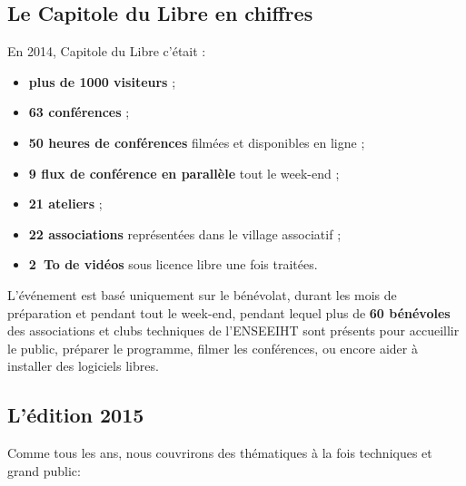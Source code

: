 \subsection{Le Capitole du Libre en chiffres}

\begin{minipage}{0.6\textwidth}
En 2014, Capitole du Libre c'était :
\begin{itemize}[label=$\bullet$]
\item \textbf{plus de 1000 visiteurs} ;
\item \textbf{63 conférences} ;
\item \textbf{50 heures de conférences} filmées et disponibles en ligne ;
\item \textbf{9 flux de conférence en parallèle} tout le week-end ;
\item \textbf{21 ateliers} ;
\item \textbf{22 associations} représentées dans le village associatif ;
\item \textbf{\SI{2}{\tera o} de vidéos} sous licence libre une fois traitées.
\end{itemize}
\end{minipage}
\begin{minipage}{0.4\textwidth}
\begin{center}
\end{center}
\end{minipage}

\Separateur

L'événement est basé uniquement sur le bénévolat, durant les mois 
de préparation et pendant tout le week-end, pendant lequel plus de \textbf{60 
bénévoles} des associations et clubs techniques de l'ENSEEIHT
sont présents pour accueillir le public, préparer le 
programme, filmer les conférences, ou encore aider à installer des 
logiciels libres.

\subsection{L'édition 2015}

Comme tous les ans, nous couvrirons des thématiques à la fois techniques et grand 
public:


